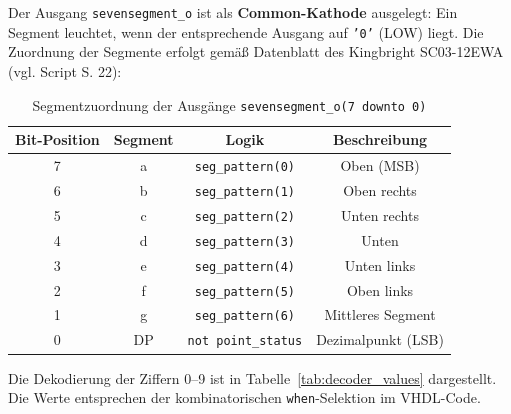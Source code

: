 Der Ausgang \texttt{sevensegment\_o} ist als \textbf{Common-Kathode} ausgelegt: Ein Segment leuchtet, wenn der entsprechende Ausgang auf \texttt{'0'} (LOW) liegt. Die Zuordnung der Segmente erfolgt gemäß Datenblatt des Kingbright SC03-12EWA (vgl. Script S. 22):

\begin{table}[H]
\centering
\caption{Segmentzuordnung der Ausgänge \texttt{sevensegment\_o(7 downto 0)}}
\label{tab:segment_mapping}
\begin{tabular}{|c|c|c|c|}
\hline
\textbf{Bit-Position} & \textbf{Segment} & \textbf{Logik} & \textbf{Beschreibung} \\
\hline
7 & a & \texttt{seg\_pattern(0)} & Oben (MSB) \\
6 & b & \texttt{seg\_pattern(1)} & Oben rechts \\
5 & c & \texttt{seg\_pattern(2)} & Unten rechts \\
4 & d & \texttt{seg\_pattern(3)} & Unten \\
3 & e & \texttt{seg\_pattern(4)} & Unten links \\
2 & f & \texttt{seg\_pattern(5)} & Oben links \\
1 & g & \texttt{seg\_pattern(6)} & Mittleres Segment \\
0 & DP & \texttt{not point\_status} & Dezimalpunkt (LSB) \\
\hline
\end{tabular}
\end{table}

Die Dekodierung der Ziffern 0--9 ist in Tabelle~\ref{tab:decoder_values} dargestellt. Die Werte entsprechen der kombinatorischen \texttt{when}-Selektion im VHDL-Code.

